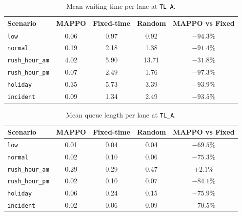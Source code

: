 ﻿\documentclass[11pt, a4paper]{report}
\begin{document}
\begin{table}[H]
\centering
\caption{Mean waiting time per lane at \texttt{TL\_A}.}
\label{tab:mappo_quantitative}
\begin{tabular}{lcccc}
\toprule
\textbf{Scenario} & \textbf{MAPPO} & \textbf{Fixed-time} & \textbf{Random} & \textbf{MAPPO vs Fixed} \\
\midrule
\texttt{low}            & 0.06  & 0.97  & 0.92  & $-94.3\%$ \\
\texttt{normal}         & 0.19  & 2.18  & 1.38  & $-91.4\%$ \\
\texttt{rush\_hour\_am} & 4.02  & 5.90  & 13.71 & $-31.8\%$ \\
\texttt{rush\_hour\_pm} & 0.07  & 2.49  & 1.76  & $-97.3\%$ \\
\texttt{holiday}        & 0.35  & 5.73  & 3.39  & $-93.9\%$ \\
\texttt{incident}       & 0.09  & 1.34  & 2.49  & $-93.5\%$ \\
\bottomrule
\end{tabular}
\end{table}

\begin{table}[H]
\centering
\caption{Mean queue length per lane at \texttt{TL\_A}.}
\label{tab:mappo_queue}
\begin{tabular}{lcccc}
\toprule
\textbf{Scenario} & \textbf{MAPPO} & \textbf{Fixed-time} & \textbf{Random} & \textbf{MAPPO vs Fixed} \\
\midrule
\texttt{low}            & 0.01 & 0.04 & 0.04 & $-69.5\%$ \\
\texttt{normal}         & 0.02 & 0.10 & 0.06 & $-75.3\%$ \\
\texttt{rush\_hour\_am} & 0.29 & 0.29 & 0.47 & $+2.1\%$ \\
\texttt{rush\_hour\_pm} & 0.02 & 0.10 & 0.07 & $-84.1\%$ \\
\texttt{holiday}        & 0.06 & 0.24 & 0.15 & $-75.9\%$ \\
\texttt{incident}       & 0.02 & 0.06 & 0.09 & $-70.5\%$ \\
\bottomrule
\end{tabular}
\end{table}
\end{document}
